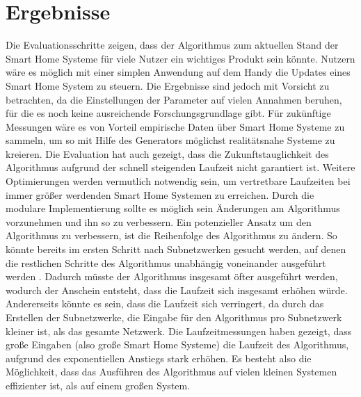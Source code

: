 \section{Ergebnisse}
Die Evaluationsschritte zeigen, dass der Algorithmus zum aktuellen Stand der Smart Home Systeme für viele Nutzer ein wichtiges Produkt sein könnte.
Nutzern wäre es möglich mit einer simplen Anwendung auf dem Handy die Updates eines Smart Home System zu steuern.
Die Ergebnisse sind jedoch mit Vorsicht zu betrachten, da die Einstellungen der Parameter auf vielen Annahmen beruhen, für die es noch
keine ausreichende Forschungsgrundlage gibt. Für zukünftige Messungen wäre es von Vorteil empirische Daten über Smart Home Systeme
zu sammeln, um so mit Hilfe des Generators möglichst realitätsnahe Systeme zu kreieren.
Die Evaluation hat auch gezeigt, dass die Zukunftstauglichkeit des Algorithmus aufgrund der schnell steigenden Laufzeit nicht garantiert ist.
Weitere Optimierungen werden vermutlich notwendig sein, um vertretbare Laufzeiten bei immer größer werdenden Smart Home Systemen zu erreichen.
Durch die modulare Implementierung sollte es möglich sein Änderungen am Algorithmus vorzunehmen und ihn so zu verbessern.
Ein potenzieller Ansatz um den Algorithmus zu verbessern, ist die Reihenfolge des Algorithmus zu ändern. So könnte bereits im ersten Schritt nach Subnetzwerken
gesucht werden, auf denen die restlichen Schritte des Algorithmus unabhängig voneinander ausgeführt werden . Dadurch müsste der Algorithmus insgesamt öfter
ausgeführt werden, wodurch der Anschein entsteht, dass die Laufzeit sich insgesamt erhöhen würde. Andererseits könnte es sein, dass die Laufzeit sich verringert,
da durch das Erstellen der Subnetzwerke, die Eingabe für den Algorithmus pro Subnetzwerk kleiner ist, als das gesamte Netzwerk. Die Laufzeitmessungen haben
gezeigt, dass große Eingaben (also große Smart Home Systeme) die Laufzeit des Algorithmus, aufgrund des exponentiellen Anstiegs stark erhöhen. Es besteht also
die Möglichkeit, dass das Ausführen des Algorithmus auf vielen kleinen Systemen effizienter ist, als auf einem großen System.






